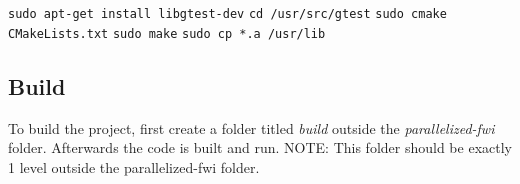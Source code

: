 \documentclass[10pt]{article}
\begin{document}
\texttt{sudo apt-get install libgtest-dev}
\newline
\texttt{cd /usr/src/gtest}
\newline
\texttt{sudo cmake CMakeLists.txt}
\newline
\texttt{sudo make}
\newline
\texttt{sudo cp *.a /usr/lib}


\subsection{Build}
To build the project, first create a folder titled \textit{build} outside the \textit{parallelized-fwi} folder. Afterwards the code is built and run. 
NOTE: This folder should be exactly 1 level outside the parallelized-fwi folder.
\newline
\end{document}
